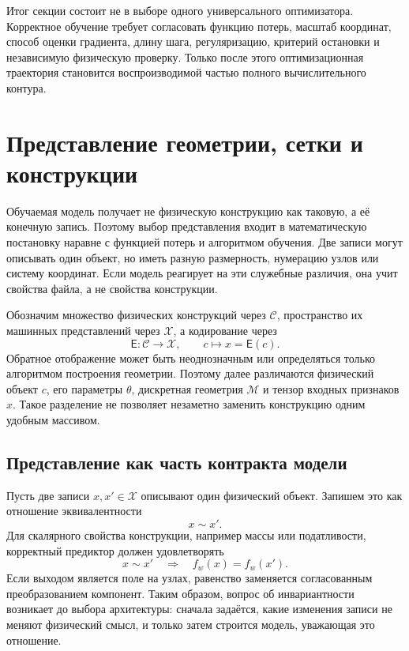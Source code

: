 Итог секции состоит не в выборе одного универсального оптимизатора. Корректное обучение требует согласовать функцию потерь, масштаб координат, способ оценки градиента, длину шага, регуляризацию, критерий остановки и независимую физическую проверку. Только после этого оптимизационная траектория становится воспроизводимой частью полного вычислительного контура.

\section{Представление геометрии, сетки и конструкции}
\label{sec:geometry-mesh-representation}
Обучаемая модель получает не физическую конструкцию как таковую, а её конечную запись. Поэтому выбор представления входит в математическую постановку наравне с функцией потерь и алгоритмом обучения. Две записи могут описывать один объект, но иметь разную размерность, нумерацию узлов или систему координат. Если модель реагирует на эти служебные различия, она учит свойства файла, а не свойства конструкции.

Обозначим множество физических конструкций через $\mathcal C$, пространство их машинных представлений через $\mathcal X$, а кодирование через
\begin{equation}
 \mathsf E:\mathcal C\to\mathcal X,
 \qquad
 c\longmapsto x=\mathsf E(c).
\end{equation}
Обратное отображение может быть неоднозначным или определяться только алгоритмом построения геометрии. Поэтому далее различаются физический объект $c$, его параметры $\theta$, дискретная геометрия $\mathcal M$ и тензор входных признаков $x$. Такое разделение не позволяет незаметно заменить конструкцию одним удобным массивом.

\subsection{Представление как часть контракта модели}
Пусть две записи $x,x'\in\mathcal X$ описывают один физический объект. Запишем это как отношение эквивалентности
\begin{equation}
 x\sim x'.
\end{equation}
Для скалярного свойства конструкции, например массы или податливости, корректный предиктор должен удовлетворять
\begin{equation}
 x\sim x'
 \quad\Longrightarrow\quad
 f_w(x)=f_w(x').
\end{equation}
Если выходом является поле на узлах, равенство заменяется согласованным преобразованием компонент. Таким образом, вопрос об инвариантности возникает до выбора архитектуры: сначала задаётся, какие изменения записи не меняют физический смысл, и только затем строится модель, уважающая это отношение.

